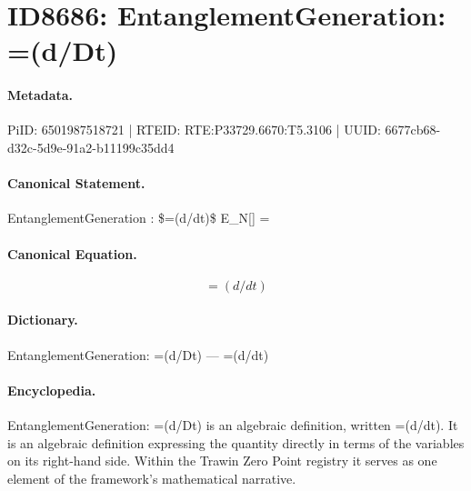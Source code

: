 \section*{ID8686: EntanglementGeneration: =(d/Dt)}
\paragraph{Metadata.}
PiID: 6501987518721 | RTEID: RTE:P33729.6670:T5.3106 | UUID: 6677cb68-d32c-5d9e-91a2-b11199c35dd4

\paragraph{Canonical Statement.}
EntanglementGeneration : \$=(d/dt)\$ E\_N[] =

\paragraph{Canonical Equation.}
\[
=(d/dt)
\]

\paragraph{Dictionary.}
EntanglementGeneration: =(d/Dt) — =(d/dt)

\paragraph{Encyclopedia.}
EntanglementGeneration: =(d/Dt) is an algebraic definition, written =(d/dt). It is an algebraic definition expressing the quantity directly in terms of the variables on its right-hand side. Within the Trawin Zero Point registry it serves as one element of the framework's mathematical narrative.
